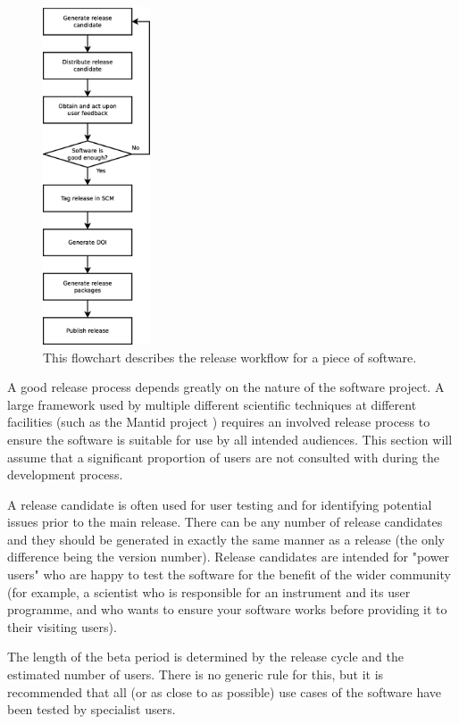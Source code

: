 \documentclass[jnr]{iosart2x}
\begin{document}
\begin{figure}
    \centering
    \includegraphics[height=10cm]{release_workflow.eps}
    \caption{This flowchart describes the release workflow for a piece of software.}
    \label{Release_Flowchart}
\end{figure}

A good release process depends greatly on the nature of the software project.
A large framework used by multiple different scientific techniques at different facilities (such as the Mantid project \cite{manitd}) requires an involved release process to ensure the software is suitable for use by all intended audiences.
This section will assume that a significant proportion of users are not consulted with during the development process.

A release candidate is often used for user testing and for identifying potential issues prior to the main release.
There can be any number of release candidates and they should be generated in exactly the same manner as a release (the only difference being the version number).
Release candidates are intended for "power users" who are happy to test the software for the benefit of the wider community (for example, a scientist who is responsible for an instrument and its user programme, and who wants to ensure your software works before providing it to their visiting users).

The length of the beta period is determined by the release cycle and the estimated number of users.
There is no generic rule for this, but it is recommended that all (or as close to as possible) use cases of the software have been tested by specialist users.
\end{document}
